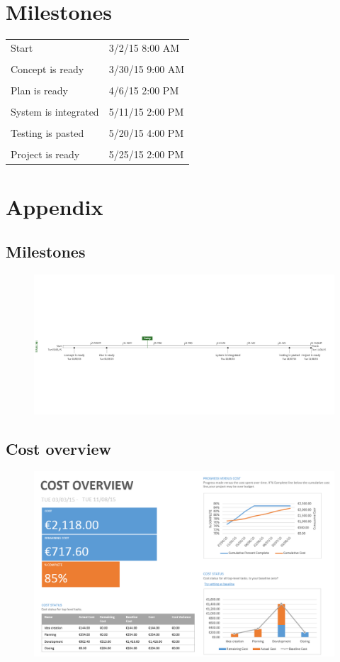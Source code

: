 \documentclass[english]{article}
\begin{document}
\section{Milestones}
\begin{tabular}{p{5cm}|p{5cm}}
Start & 3/2/15 8:00 AM
 \\\\
Concept is ready & 3/30/15 9:00 AM
\\\\
Plan is ready & 4/6/15 2:00 PM
\\\\
System is integrated & 5/11/15 2:00 PM
\\\\
Testing is pasted & 5/20/15 4:00 PM
\\\\
Project is ready & 5/25/15 2:00 PM


\end{tabular}
\newpage
\section{Appendix}
\subsection{Milestones}
\begin{figure}[H]
\centerline{\includegraphics[scale=0.6]{FR/timeline}}
\end{figure}
\newpage
\subsection{Cost overview}
\begin{figure}[h]
\centerline{\includegraphics[scale=0.77]{FR/costs}}
\end{figure}
\newpage
\end{document}
